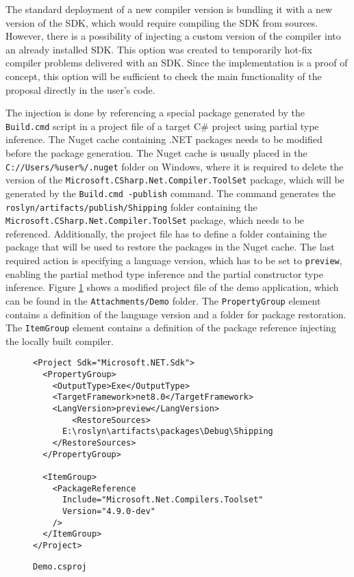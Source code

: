 The standard deployment of a new compiler version is bundling it with a new version of the SDK, which would require compiling the SDK from sources. 
However, there is a possibility of injecting a custom version of the compiler into an already installed SDK. 
This option was created to temporarily hot-fix compiler problems delivered with an SDK. 
Since the implementation is a proof of concept, this option will be sufficient to check the main functionality of the proposal directly in the user’s code.
\par
The injection is done by referencing a special package generated by the\\ \texttt{Build.cmd} script in a project file of a target C\# project using partial type inference. The Nuget cache containing .NET packages needs to be modified before the package generation. 
The Nuget cache is usually placed in the\\ \texttt{C://Users/\%user\%/.nuget} folder on Windows, where it is required to delete the version of the \texttt{Microsoft.CSharp.Net.Compiler.ToolSet} package, which will be generated by the \texttt{Build.cmd -publish} command. 
The command generates the \texttt{roslyn/artifacts/publish/Shipping} folder containing the\\ \texttt{Microsoft.CSharp.Net.Compiler.ToolSet} package, which needs to be referenced. 
Additionally, the project file has to define a folder containing the package that will be used to restore the packages in the Nuget cache. 
The last required action is specifying a language version, which has to be set to \texttt{preview}, enabling the partial method type inference and the partial constructor type inference. 
Figure \ref{img68:csproj} shows a modified project file of the demo application, which can be found in the \texttt{Attachments/Demo} folder. 
The \texttt{PropertyGroup} element contains a definition of the language version and a folder for package restoration. 
The \texttt{ItemGroup} element contains a definition of the package reference injecting the locally built compiler.
\begin{figure}[h]
\begin{lstlisting}
<Project Sdk="Microsoft.NET.Sdk">
  <PropertyGroup>
    <OutputType>Exe</OutputType>
    <TargetFramework>net8.0</TargetFramework>
    <LangVersion>preview</LangVersion>
        <RestoreSources>
      E:\roslyn\artifacts\packages\Debug\Shipping
    </RestoreSources>
  </PropertyGroup>

  <ItemGroup>
    <PackageReference 
      Include="Microsoft.Net.Compilers.Toolset" 
      Version="4.9.0-dev"
    />
  </ItemGroup>
</Project>
\end{lstlisting}
\caption{\texttt{Demo.csproj}}
\label{img68:csproj}
\end{figure}
